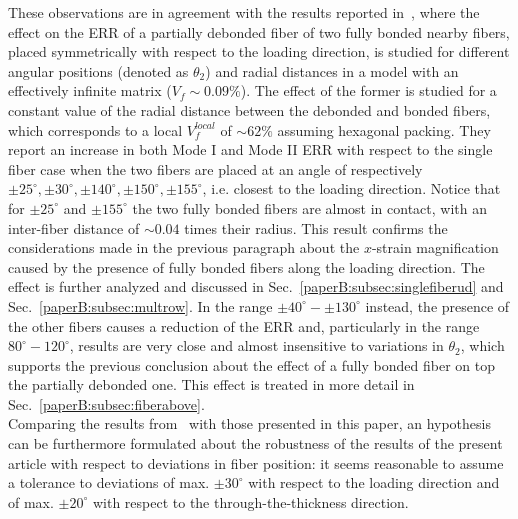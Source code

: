 These observations are in agreement with the results reported in~\cite{Sandino2016}, where the effect on the ERR of a partially debonded fiber of two fully bonded nearby fibers, placed symmetrically with respect to the loading direction, is studied for different angular positions (denoted as $\theta_{2}$) and radial distances in a model with an effectively infinite matrix ($V_{f}\sim0.09\%$). The effect of the former is studied for a constant value of the radial distance between the debonded and bonded fibers, which corresponds to a local $V_{f}^{local}$ of $\sim62\%$ assuming hexagonal packing. They report an increase in both Mode I and Mode II ERR with respect to the single fiber case when the two fibers are placed at an angle of respectively $\pm25^{\circ},\pm30^{\circ},\pm140^{\circ},\pm150^{\circ},\pm155^{\circ}$, i.e. closest to the loading direction. Notice that for $\pm25^{\circ}$ and $\pm155^{\circ}$ the two fully bonded fibers are almost in contact, with an inter-fiber distance of $\sim0.04$ times their radius. This result confirms the considerations made in the previous paragraph about the $x$-strain magnification caused by the presence of fully bonded fibers along the loading direction. The effect is further analyzed and discussed in Sec.~\ref{paperB:subsec:singlefiberud} and Sec.~\ref{paperB:subsec:multrow}. In the range $\pm40^{\circ}-\pm130^{\circ}$ instead, the presence of the other fibers causes a reduction of the ERR and, particularly in the range $80^{\circ}-120^{\circ}$, results are very close and almost insensitive to variations in $\theta_{2}$, which supports the previous conclusion about the effect of a fully bonded fiber on top the partially debonded one. This effect is treated in more detail in Sec.~\ref{paperB:subsec:fiberabove}.\\
Comparing the results from~\cite{Sandino2016} with those presented in this paper, an hypothesis can be furthermore formulated about the robustness of the results of the present article with respect to deviations in fiber position: it seems reasonable to assume a tolerance to deviations of max. $\pm30^{\circ}$ with respect to the loading direction and of max. $\pm20^{\circ}$ with respect to the through-the-thickness direction.\\
